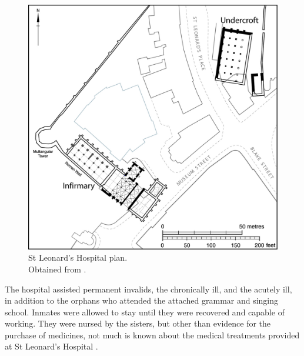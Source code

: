 \documentclass[%
	]{ijsra}
\begin{document}
 	\begin{figure}
 		\includegraphics[width=\linewidth]{figures/Pereda-Figure01}
 		\caption{St Leonard’s Hospital plan.
    {\normalfont\scriptsize \\ Obtained from \textcite[100, fig. 37]{Thomas_2002}.
              }}
 		\label{fig:Perada-Figure01}
 	\end{figure}
 
 The hospital assisted permanent invalids, the chronically ill, and the acutely ill, in addition to the orphans who attended the attached grammar and singing school. Inmates were allowed to stay until they were recovered and capable of working. They were nursed by the sisters, but other than evidence for the purchase of medicines, not much is known about the medical treatments provided at St Leonard’s Hospital \parencites[5,12-15]{Cullum_1991}[21]{Dainton_1961}[97]{Dean_2008}[134]{Goldberg_1992}{Page_1974}[78,109]{Palliser_2014}.
 
\end{document}
